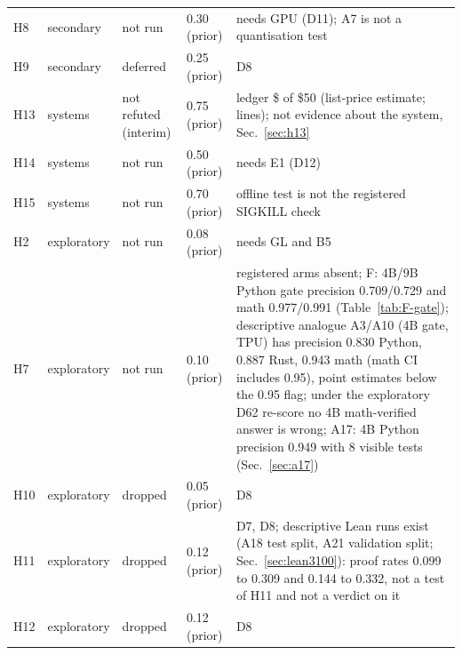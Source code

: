 \documentclass[11pt,a4paper]{article}
\begin{document}
\begin{table}[!htbp]
\begin{tabular}{l l p{2.3cm} l p{5.6cm}}
H8 & secondary & not run & 0.30 (prior) & needs GPU (D11); A7 is not a quantisation test\\
H9 & secondary & deferred & 0.25 (prior) & D8\\
H13 & systems & not refuted (interim) & 0.75 (prior) & ledger \$\SpendTotalNow{} of \$50 (list-price estimate; \SpendLinesNow{} lines); not evidence about the system, Sec.~\ref{sec:h13}\\
H14 & systems & not run & 0.50 (prior) & needs E1 (D12)\\
H15 & systems & not run & 0.70 (prior) & offline test is not the registered SIGKILL check\\
H2 & exploratory & not run & 0.08 (prior) & needs GL and B5\\
H7 & exploratory & not run & 0.10 (prior) & registered arms absent; F: 4B/9B Python gate precision 0.709/0.729 and math 0.977/0.991 (Table~\ref{tab:F-gate}); descriptive analogue A3/A10 (4B gate, TPU) has precision 0.830 Python, 0.887 Rust, 0.943 math (math CI includes 0.95), point estimates below the 0.95 flag; under the exploratory D62 re-score no 4B math-verified answer is wrong; A17: 4B Python precision 0.949 with 8 visible tests (Sec.~\ref{sec:a17})\\
H10 & exploratory & dropped & 0.05 (prior) & D8\\
H11 & exploratory & dropped & 0.12 (prior) & D7, D8; descriptive Lean runs exist (A18 test split, A21 validation split; Sec.~\ref{sec:lean3100}): proof rates 0.099 to 0.309 and 0.144 to 0.332, not a test of H11 and not a verdict on it\\
H12 & exploratory & dropped & 0.12 (prior) & D8\\
\bottomrule\end{tabular}\end{table}
\end{document}
